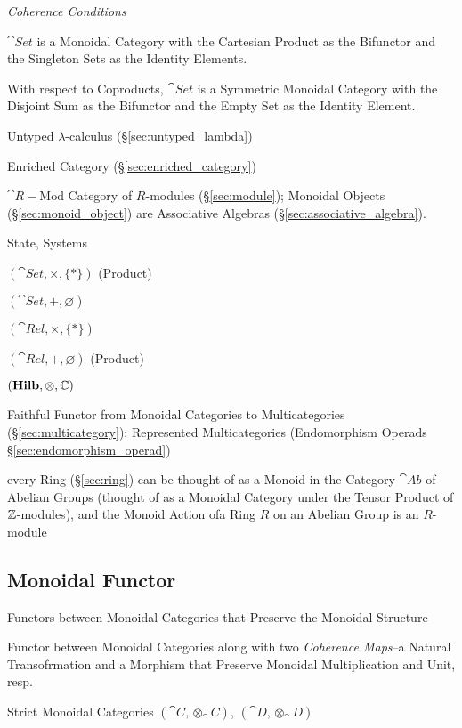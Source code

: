 \emph{Coherence Conditions}

$\cat{Set}$ is a Monoidal Category with the Cartesian Product as
the Bifunctor and the Singleton Sets as the Identity Elements.

With respect to Coproducts, $\cat{Set}$ is a Symmetric Monoidal
Category with the Disjoint Sum as the Bifunctor and the Empty
Set as the Identity Element.

Untyped $\lambda$-calculus (\S\ref{sec:untyped_lambda})

Enriched Category (\S\ref{sec:enriched_category})

$\cat{R-\text{Mod}}$ Category of $R$-modules (\S\ref{sec:module});
Monoidal Objects (\S\ref{sec:monoid_object}) are Associative Algebras
(\S\ref{sec:associative_algebra}).

State, Systems %

$(\cat{Set}, \times, \{*\})$ (Product)

$(\cat{Set}, +, \varnothing)$

$(\cat{Rel}, \times, \{*\})$

$(\cat{Rel}, +, \varnothing)$ (Product)

$(\mathbf{Hilb}, \otimes, \mathbb{C})$

Faithful Functor from Monoidal Categories to Multicategories
(\S\ref{sec:multicategory}): Represented Multicategories (Endomorphism
Operads \S\ref{sec:endomorphism_operad})

every Ring (\S\ref{sec:ring}) can be thought of as a Monoid in the Category
$\cat{Ab}$ of Abelian Groups (thought of as a Monoidal Category under the
Tensor Product of $\mathbb{Z}$-modules), and the Monoid Action ofa Ring $R$ on an
Abelian Group is an $R$-module



\subsection{Monoidal Functor}\label{sec:monoidal_functor}

Functors between Monoidal Categories that Preserve the Monoidal
Structure

Functor between Monoidal Categories along with two \emph{Coherence
  Maps}--a Natural Transofrmation and a Morphism that Preserve
Monoidal Multiplication and Unit, resp.

Strict Monoidal Categories $(\cat{C},\otimes_\cat{C})$,
$(\cat{D},\otimes_\cat{D})$


